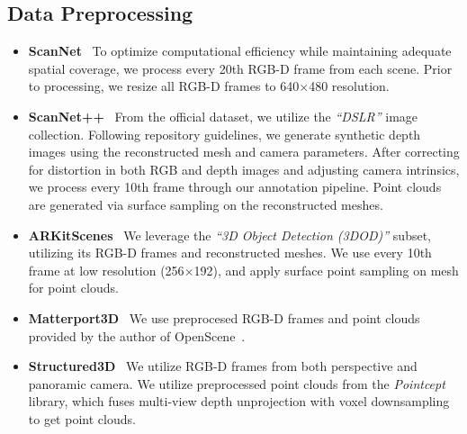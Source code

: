 \subsection{Data Preprocessing}
\begin{itemize}[leftmargin=*,itemsep=1pt]
    \item \textbf{ScanNet}~\cite{dai2017scannet} To optimize computational efficiency while maintaining adequate spatial coverage, we process every 20th RGB-D frame from each scene. Prior to processing, we resize all RGB-D frames to 640$\times$480 resolution.
    \item \textbf{ScanNet++}~\cite{yeshwanth2023scannet++} From the official dataset, we utilize the \textit{``DSLR''} image collection. Following repository guidelines, we generate synthetic depth images using the reconstructed mesh and camera parameters. After correcting for distortion in both RGB and depth images and adjusting camera intrinsics, we process every 10th frame through our annotation pipeline. Point clouds are generated via surface sampling on the reconstructed meshes.
    \item \textbf{ARKitScenes}~\cite{baruch2021arkitscenes} We leverage the \textit{``3D Object Detection (3DOD)''} subset, utilizing its RGB-D frames and reconstructed meshes. We use every 10th frame at low resolution (256$\times$192), and apply surface point sampling on mesh for point clouds.
    \item \textbf{Matterport3D}~\cite{chang2017matterport3d} We use preprocesed RGB-D frames and point clouds provided by the author of OpenScene~\cite{Peng2023OpenScene}.
    \item \textbf{Structured3D}~\cite{zheng2020structured3d} We utilize RGB-D frames from both perspective and panoramic camera. We utilize preprocessed point clouds from the \textit{Pointcept}~\cite{pointcept2023} library, which fuses multi-view depth unprojection with voxel downsampling to get point clouds.
\end{itemize}

